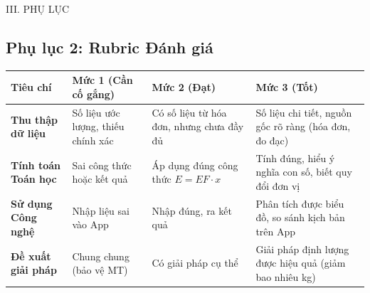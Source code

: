 \documentclass[12pt,a4paper]{article}
\begin{document}
\begin{sectionbox}{III. PHỤ LỤC}
\subsection*{Phụ lục 2: Rubric Đánh giá}
\begin{tabularx}{\textwidth}{|>{\bfseries}l|X|X|X|}
\hline
\rowcolor{primary!20} Tiêu chí & Mức 1 (Cần cố gắng) & Mức 2 (Đạt) & Mức 3 (Tốt) \\
\hline
Thu thập dữ liệu & Số liệu ước lượng, thiếu chính xác & Có số liệu từ hóa đơn, nhưng chưa đầy đủ & Số liệu chi tiết, nguồn gốc rõ ràng (hóa đơn, đo đạc) \\
\hline
Tính toán Toán học & Sai công thức hoặc kết quả & Áp dụng đúng công thức $E=EF \cdot x$ & Tính đúng, hiểu ý nghĩa con số, biết quy đổi đơn vị \\
\hline
Sử dụng Công nghệ & Nhập liệu sai vào App & Nhập đúng, ra kết quả & Phân tích được biểu đồ, so sánh kịch bản trên App \\
\hline
Đề xuất giải pháp & Chung chung (bảo vệ MT) & Có giải pháp cụ thể & Giải pháp định lượng được hiệu quả (giảm bao nhiêu kg) \\
\hline
\end{tabularx}

\end{sectionbox}
\end{document}
